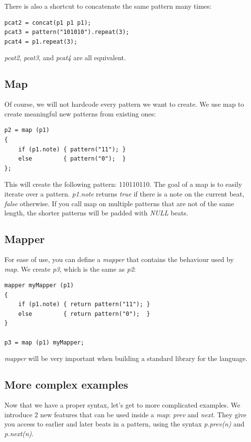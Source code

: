 \documentclass[11pt,twoside]{article}
\begin{document}
There is also a shortcut to concatenate the same pattern many times:
\begin{verbatim}
pcat2 = concat(p1 p1 p1);
pcat3 = pattern("101010").repeat(3);
pcat4 = p1.repeat(3);
\end{verbatim}
\textit{pcat2}, \textit{pcat3}, and \textit{pcat4} are all equivalent.

\subsection{Map}
Of course, we will not hardcode every pattern we want to create. We use
map to create meaningful new patterns from existing ones:
\begin{verbatim}
p2 = map (p1)
{
    if (p1.note) { pattern("11"); }
    else         { pattern("0");  }
};
\end{verbatim}
This will create the following pattern: 110110110. The goal of a map
is to easily iterate over a pattern. \textit{p1.note} returns
\textit{true} if there is a note on the current beat, \textit{false} otherwise.
If you call map on multiple patterns that are not of the same length,
the shorter patterns will be padded with \textit{NULL} beats.\\

\subsection{Mapper}
For ease of use, you can define a \textit{mapper} that contains the behaviour
used by \textit{map}. We create \textit{p3}, which is the same as
\textit{p2}:
\begin{verbatim}
mapper myMapper (p1)
{
    if (p1.note) { return pattern("11"); }
    else         { return pattern("0");  }
}

p3 = map (p1) myMapper;
\end{verbatim}
\textit{mapper} will be very important when building a standard library
for the language.

\subsection{More complex examples}
Now that we have a proper syntax, let's get to more complicated examples.
We introduce $2$ new features that can be used inside a \textit{map}:
\textit{prev} and \textit{next}. They give you access to earlier
and later beats in a pattern, using the syntax \textit{p.prev(n)} and
\textit{p.next(n)}. 
\end{document}
